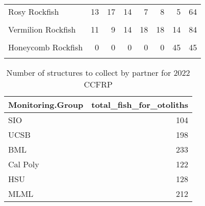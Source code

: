\documentclass[
]{article}
\begin{document}
\begin{table}
\begin{tabular}[t]{lrrrrrrr}
Rosy Rockfish & 13 & 17 & 14 & 7 & 8 & 5 & 64\\
\cellcolor{gray!6}{Treefish} & \cellcolor{gray!6}{0} & \cellcolor{gray!6}{0} & \cellcolor{gray!6}{4} & \cellcolor{gray!6}{7} & \cellcolor{gray!6}{19} & \cellcolor{gray!6}{9} & \cellcolor{gray!6}{39}\\
\addlinespace
Vermilion Rockfish & 11 & 9 & 14 & 18 & 18 & 14 & 84\\
\cellcolor{gray!6}{Yellowtail Rockfish} & \cellcolor{gray!6}{20} & \cellcolor{gray!6}{14} & \cellcolor{gray!6}{12} & \cellcolor{gray!6}{6} & \cellcolor{gray!6}{0} & \cellcolor{gray!6}{0} & \cellcolor{gray!6}{52}\\
Honeycomb Rockfish & 0 & 0 & 0 & 0 & 0 & 45 & 45\\
\cellcolor{gray!6}{Starry Rockfish} & \cellcolor{gray!6}{0} & \cellcolor{gray!6}{0} & \cellcolor{gray!6}{0} & \cellcolor{gray!6}{0} & \cellcolor{gray!6}{4} & \cellcolor{gray!6}{0} & \cellcolor{gray!6}{4}\\
\bottomrule
\end{tabular}
\end{table}

\begin{table}

\caption{\label{tab:partnernumbers}Number of structures to collect by partner for 2022 CCFRP}
\centering
\begin{tabular}[t]{lr}
\toprule
Monitoring.Group & total\_fish\_for\_otoliths\\
\midrule
SIO & 104\\
UCSB & 198\\
BML & 233\\
Cal Poly & 122\\
HSU & 128\\
\addlinespace
MLML & 212\\
\bottomrule
\end{tabular}
\end{table}

\FloatBarrier

\clearpage
\newpage
\end{document}
